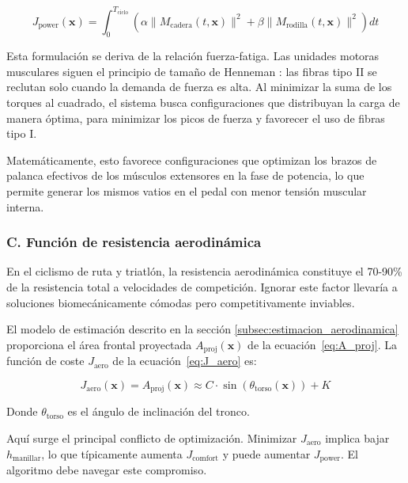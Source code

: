\begin{equation}
  \label{eq:J_power}
  J_{\text{power}}(\mathbf{x}) = \int_{0}^{T_{\text{ciclo}}} \left( \alpha \|M_{\text{cadera}}(t, \mathbf{x})\|^2 + \beta \|M_{\text{rodilla}}(t, \mathbf{x})\|^2 \right) dt
\end{equation}

Esta formulación se deriva de la relación fuerza-fatiga. Las unidades motoras
musculares siguen el principio de tamaño de Henneman \citep{Henneman1965}: las fibras tipo II se
reclutan solo cuando la demanda de fuerza es alta. Al minimizar la suma de los
torques al cuadrado, el sistema busca configuraciones que distribuyan la carga
de manera óptima, para minimizar los picos de fuerza y favorecer el uso de
fibras tipo I.

Matemáticamente, esto favorece configuraciones que optimizan los brazos de
palanca efectivos de los músculos extensores en la fase de potencia, lo que
permite generar los mismos vatios en el pedal con menor tensión muscular
interna.

\subsubsection{C. Función de resistencia aerodinámica}

En el ciclismo de ruta y triatlón, la resistencia aerodinámica constituye el
70-90\% de la resistencia total a velocidades de competición. Ignorar este
factor llevaría a soluciones biomecánicamente cómodas pero competitivamente
inviables.

El modelo de estimación descrito en la sección \ref{subsec:estimacion_aerodinamica}
proporciona el área frontal proyectada $A_{\text{proj}}(\mathbf{x})$ de la ecuación~\ref{eq:A_proj}. La
función de coste $J_{\text{aero}}$ de la ecuación~\ref{eq:J_aero} es:

\begin{equation}
  \label{eq:J_aero}
  J_{\text{aero}}(\mathbf{x}) = A_{\text{proj}}(\mathbf{x}) \approx C \cdot \sin(\theta_{\text{torso}}(\mathbf{x})) + K
\end{equation}

Donde $\theta_{\text{torso}}$ es el ángulo de inclinación del tronco.

Aquí surge el principal conflicto de optimización. Minimizar $J_{\text{aero}}$
implica bajar $h_{\text{manillar}}$, lo que típicamente aumenta
$J_{\text{comfort}}$ y puede aumentar $J_{\text{power}}$. El algoritmo debe
navegar este compromiso.

